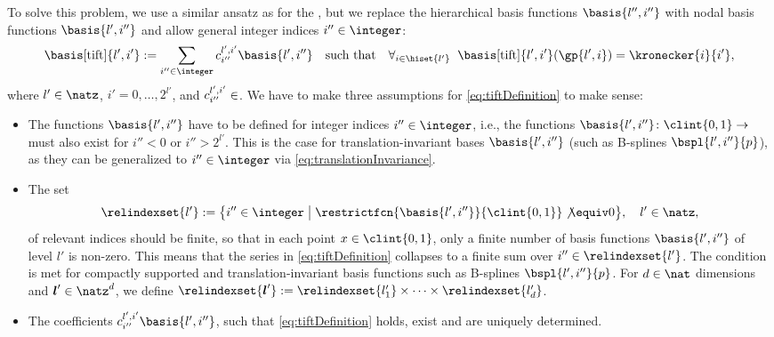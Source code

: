 To solve this problem,
we use a similar ansatz as for the \hftr,
but we replace the hierarchical basis functions $\basis{l'',i''}$
with nodal basis functions $\basis{l',i''}$ and
allow general integer indices $i'' \in \integer$:
\begin{equation}
  \label{eq:tiftDefinition}
  \basis[\tift]{l',i'}
  := \sum_{i'' \in \integer} c_{i''}^{l',i'} \basis{l',i''}
  \quad\text{such that}\quad
  \falarge{i \in \hiset{l'}}{
    \basis[\tift]{l',i'}(\gp{l',i}) = \kronecker{i}{i'},
  }
\end{equation}
where $l' \in \natz$, $i' = 0, \dotsc, 2^{l'}$, and
$c_{i''}^{l',i'} \in \real$.
We have to make three assumptions for \eqref{eq:tiftDefinition} to make sense:

\begin{itemize}
  \item
  The functions $\basis{l',i''}$ have to be defined for integer indices
  $i'' \in \integer$, i.e.,
  the functions $\basis{l',i''}\colon \clint{0, 1} \to \real$
  must also exist for $i'' < 0$ or $i'' > 2^{l'}$.
  This is the case for translation-invariant bases
  $\basis{l',i''}$ (such as B-splines $\bspl{l',i''}{p}$),
  as they can be generalized to $i'' \in \integer$
  via \cref{eq:translationInvariance}.
  
  \item
  The set
  \begin{equation}
    \relindexset{l'}
    := \bigl\{i'' \in \integer \bigm\vert
    \restrictfcn{\basis{l',i''}}{\clint{0, 1}} \not\equiv 0\bigr\},\quad
    l' \in \natz,
  \end{equation}
  of relevant indices should be finite,
  so that in each point $x \in \clint{0, 1}$,
  only a finite number of basis functions $\basis{l',i''}$ of level $l'$
  is non-zero.
  This means that the series in \eqref{eq:tiftDefinition} collapses to a
  finite sum over $i'' \in \relindexset{l'}$.
  The condition is met for compactly supported and translation-invariant
  basis functions such as B-splines $\bspl{l',i''}{p}$.
  For $d \in \nat$ dimensions and $\*l' \in \natz^d$, we define
  $\relindexset{\*l'} :=
  \relindexset{l'_1} \times \dotsb \times \relindexset{l'_d}$.
  
  \item
  The coefficients $c_{i''}^{l',i'} \basis{l',i''}$, such that
  \eqref{eq:tiftDefinition} holds, exist and are uniquely determined.
\end{itemize}

